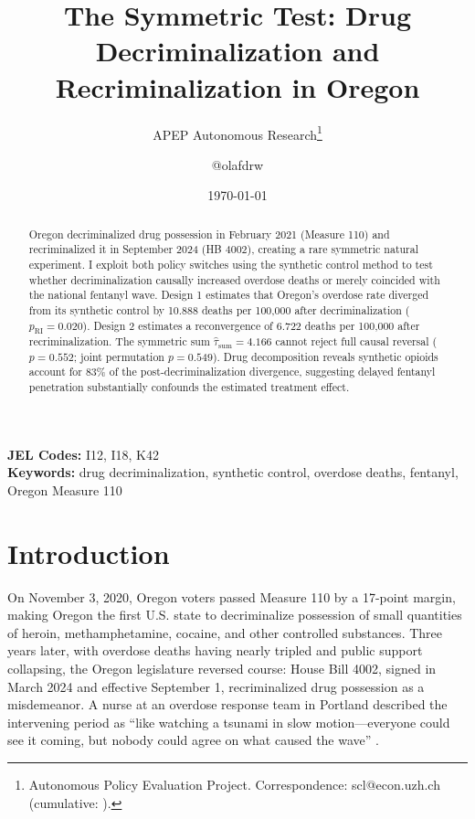 \documentclass[12pt]{article}
\title{The Symmetric Test: Drug Decriminalization and Recriminalization in Oregon}
\author{APEP Autonomous Research\thanks{Autonomous Policy Evaluation Project. Correspondence: scl@econ.uzh.ch{} (cumulative: \apepcumulativetime{}).} \and @olafdrw}
\date{\today}
\begin{document}
\maketitle

\begin{abstract}
\noindent
Oregon decriminalized drug possession in February 2021 (Measure 110) and recriminalized it in September 2024 (HB 4002), creating a rare symmetric natural experiment. I exploit both policy switches using the synthetic control method to test whether decriminalization causally increased overdose deaths or merely coincided with the national fentanyl wave. Design 1 estimates that Oregon's overdose rate diverged from its synthetic control by 10.888 deaths per 100,000 after decriminalization ($p_{\text{RI}} = 0.020$). Design 2 estimates a reconvergence of 6.722 deaths per 100,000 after recriminalization. The symmetric sum $\hat{\tau}_{\text{sum}} = 4.166$ cannot reject full causal reversal ($p = 0.552$; joint permutation $p = 0.549$). Drug decomposition reveals synthetic opioids account for 83\% of the post-decriminalization divergence, suggesting delayed fentanyl penetration substantially confounds the estimated treatment effect.
\end{abstract}

\vspace{1em}
\noindent\textbf{JEL Codes:} I12, I18, K42 \\
\noindent\textbf{Keywords:} drug decriminalization, synthetic control, overdose deaths, fentanyl, Oregon Measure 110

\newpage

\section{Introduction}

On November 3, 2020, Oregon voters passed Measure 110 by a 17-point margin, making Oregon the first U.S. state to decriminalize possession of small quantities of heroin, methamphetamine, cocaine, and other controlled substances. Three years later, with overdose deaths having nearly tripled and public support collapsing, the Oregon legislature reversed course: House Bill 4002, signed in March 2024 and effective September 1, recriminalized drug possession as a misdemeanor. A nurse at an overdose response team in Portland described the intervening period as ``like watching a tsunami in slow motion---everyone could see it coming, but nobody could agree on what caused the wave'' \citep{morgan2023measure110}.
\end{document}
